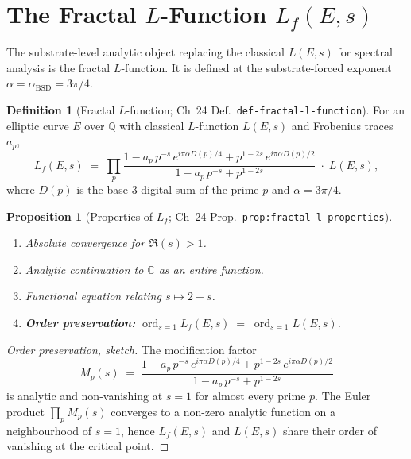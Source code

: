 \documentclass[11pt,a4paper]{article}
\theoremstyle{plain}
\newtheorem{proposition}[theorem]{Proposition}
\theoremstyle{definition}
\newtheorem{definition}[theorem]{Definition}
\theoremstyle{remark}
\newcommand{\Q}{\mathbb{Q}}
\newcommand{\C}{\mathbb{C}}
\newcommand{\ord}{\operatorname{ord}}
\begin{document}
\section{The Fractal $L$-Function $L_{f}(E, s)$}
\label{sec:fractalL}

The substrate-level analytic object replacing the classical
$L(E, s)$ for spectral analysis is the fractal $L$-function. It is
defined at the substrate-forced exponent
$\alpha = \alpha_{\mathrm{BSD}} = 3\pi/4$.

\begin{definition}[Fractal $L$-function;
                   Ch~24 Def.~\texttt{def-fractal-l-function}]
\label{def:fractal-L}
For an elliptic curve $E$ over $\Q$ with classical $L$-function
$L(E, s)$ and Frobenius traces $a_{p}$,
\[
L_{f}(E, s) \;=\;
\prod_{p}
  \frac{1 - a_{p}\,p^{-s}\,e^{i\pi\alpha D(p)/4}
        + p^{1 - 2s}\,e^{i\pi\alpha D(p)/2}}
       {1 - a_{p}\,p^{-s} + p^{1-2s}}
  \;\cdot\; L(E, s),
\]
where $D(p)$ is the base-$3$ digital sum of the prime $p$ and
$\alpha = 3\pi/4$.
\end{definition}

\begin{proposition}[Properties of $L_{f}$;
                    Ch~24 Prop.~\texttt{prop:fractal-l-properties}]
\label{prop:fractalL}
\
\begin{enumerate}[label=(\roman*),leftmargin=*,nosep]
\item Absolute convergence for $\Re(s) > 1$.
\item Analytic continuation to $\C$ as an entire function.
\item Functional equation relating $s \mapsto 2 - s$.
\item \textbf{Order preservation:}
$\ord_{s=1} L_{f}(E, s) \;=\; \ord_{s=1} L(E, s)$.
\end{enumerate}
\end{proposition}

\begin{proof}[Order preservation, sketch]
The modification factor
\[
M_{p}(s) \;=\;
\frac{1 - a_{p}\,p^{-s}\,e^{i\pi\alpha D(p)/4}
      + p^{1 - 2s}\,e^{i\pi\alpha D(p)/2}}
     {1 - a_{p}\,p^{-s} + p^{1-2s}}
\]
is analytic and non-vanishing at $s = 1$ for almost every prime
$p$. The Euler product $\prod_{p} M_{p}(s)$ converges to a non-zero
analytic function on a neighbourhood of $s = 1$, hence
$L_{f}(E, s)$ and $L(E, s)$ share their order of vanishing at the
critical point.
\end{proof}
\end{document}
